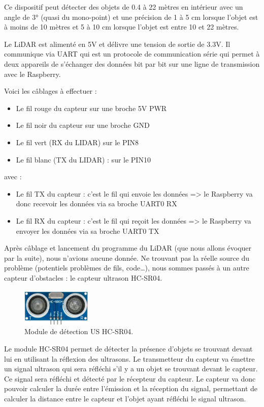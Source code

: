 \documentclass[a4paper,12pt]{report}  %
\begin{document}
Ce dispositif peut détecter des objets de 0.4 à 22 mètres en intérieur avec un angle de 3° (quasi du mono-point) et une précision de 1 à 5 cm lorsque l’objet est à moins de 10 mètres et 5 à 10 cm lorsque l’objet est entre 10 et 22 mètres. 

Le LiDAR est alimenté en 5V et délivre une tension de sortie de 3.3V. 
Il communique via UART qui est un protocole de communication série qui permet à deux appareils de s’échanger des données bit par bit sur une ligne de transmission avec le Raspberry.

Voici les câblages à effectuer :
\begin{itemize}
	\item Le fil rouge du capteur sur une broche 5V PWR 
	\item Le fil noir du capteur sur une broche GND
	\item Le fil vert (RX du LIDAR) sur le PIN8
	\item Le fil blanc (TX du LIDAR) : sur le PIN10
\end{itemize}

avec : 

\begin{itemize}
	\item Le fil TX du capteur : c’est le fil qui envoie les données => le Raspberry va donc recevoir les données via sa broche UART0 RX
	\item Le fil RX du capteur : c’est le fil qui reçoit les données => le Raspberry va envoyer les données via sa broche UART0 TX
\end{itemize}

Après câblage et lancement du programme du LiDAR (que nous allons évoquer par la suite), nous n’avions aucune donnée. Ne trouvant pas la réelle source du problème (potentiels problèmes de fils, code…), nous sommes passés à un autre capteur d’obstacles : le capteur ultrason HC-SR04.

\begin{figure}[H]
	\centering
	\includegraphics[width=0.3\textwidth]{./attachments/capteur_ultrason.jpg}
	\caption{Module de détection US HC-SR04.}
	\label{fig:capteur_us}
\end{figure}

Le module HC-SR04 permet de détecter la présence d’objets se trouvant devant lui en utilisant la réflexion des ultrasons. Le transmetteur du capteur va émettre un signal ultrason qui sera réfléchi s’il y a un objet se trouvant devant le capteur. Ce signal sera réfléchi et détecté par le récepteur du capteur. Le capteur va donc pouvoir calculer la durée entre l’émission et la réception du signal, permettant de calculer la distance entre le capteur et l’objet ayant réfléchi le signal ultrason. 
\end{document}
